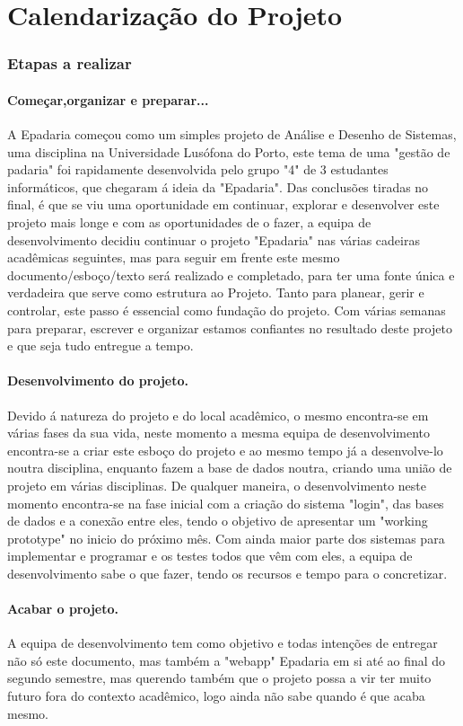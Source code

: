 \chapter{Calendarização do Projeto}
\label{calendarizacao}
\subsection{Etapas a realizar}
\subsubsection{	Começar,organizar e preparar...}
A Epadaria começou como um simples projeto de Análise e Desenho de Sistemas, uma disciplina na Universidade Lusófona do Porto, este tema de uma "gestão de padaria" foi rapidamente desenvolvida pelo grupo "4" de 3 estudantes informáticos, que chegaram á ideia da "Epadaria". Das conclusões tiradas no final, é que se viu uma oportunidade em continuar, explorar e desenvolver este projeto mais longe e com as oportunidades de o fazer, a equipa de desenvolvimento decidiu continuar o projeto "Epadaria" nas várias cadeiras acadêmicas seguintes, mas para seguir em frente este mesmo documento/esboço/texto será realizado e completado, para ter uma fonte única e verdadeira que serve como estrutura ao Projeto. Tanto para planear, gerir e controlar, este passo é essencial como fundação do projeto. Com várias semanas para preparar, escrever e organizar estamos confiantes no resultado deste projeto e que seja tudo entregue a tempo.
\subsubsection{Desenvolvimento do projeto.}
Devido á natureza do projeto e do local acadêmico, o mesmo encontra-se em várias fases da sua vida, neste momento a mesma equipa de desenvolvimento encontra-se a criar este esboço do projeto e ao mesmo tempo já a desenvolve-lo noutra disciplina, enquanto fazem a base de dados noutra, criando uma união de projeto em várias disciplinas. De qualquer maneira, o desenvolvimento neste momento encontra-se na fase inicial com a criação do sistema "login", das bases de dados e a conexão entre eles, tendo o objetivo de apresentar um "working prototype" no inicio do próximo mês. Com ainda maior parte dos sistemas para implementar e programar e os testes todos que vêm com eles, a equipa de desenvolvimento sabe o que fazer, tendo os recursos e tempo para o concretizar.
\subsubsection{Acabar o projeto.}
A equipa de desenvolvimento tem como objetivo e todas intenções de entregar não só este documento, mas também a "webapp" Epadaria em si até ao final do segundo semestre, mas querendo também que o projeto possa a vir ter muito futuro fora do contexto acadêmico, logo ainda não sabe quando é que acaba mesmo.

